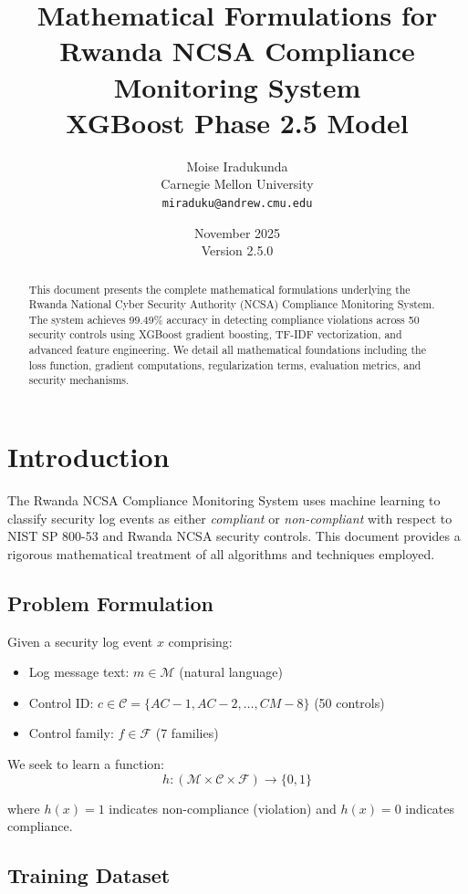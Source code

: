 \documentclass[12pt,a4paper]{article}
\title{\textbf{Mathematical Formulations for Rwanda NCSA Compliance Monitoring System} \\
\large XGBoost Phase 2.5 Model}
\author{Moise Iradukunda \\
Carnegie Mellon University \\
\texttt{miraduku@andrew.cmu.edu}}
\date{November 2025 \\
Version 2.5.0}
\begin{document}
\maketitle

\begin{abstract}
This document presents the complete mathematical formulations underlying the Rwanda National Cyber Security Authority (NCSA) Compliance Monitoring System. The system achieves 99.49\% accuracy in detecting compliance violations across 50 security controls using XGBoost gradient boosting, TF-IDF vectorization, and advanced feature engineering. We detail all mathematical foundations including the loss function, gradient computations, regularization terms, evaluation metrics, and security mechanisms.
\end{abstract}

\tableofcontents
\newpage

\section{Introduction}

The Rwanda NCSA Compliance Monitoring System uses machine learning to classify security log events as either \textit{compliant} or \textit{non-compliant} with respect to NIST SP 800-53 and Rwanda NCSA security controls. This document provides a rigorous mathematical treatment of all algorithms and techniques employed.

\subsection{Problem Formulation}

Given a security log event $x$ comprising:
\begin{itemize}
    \item Log message text: $m \in \mathcal{M}$ (natural language)
    \item Control ID: $c \in \mathcal{C} = \{AC-1, AC-2, \ldots, CM-8\}$ (50 controls)
    \item Control family: $f \in \mathcal{F}$ (7 families)
\end{itemize}

We seek to learn a function:
$$h: (\mathcal{M} \times \mathcal{C} \times \mathcal{F}) \rightarrow \{0, 1\}$$

where $h(x) = 1$ indicates non-compliance (violation) and $h(x) = 0$ indicates compliance.

\subsection{Training Dataset}
\end{document}
